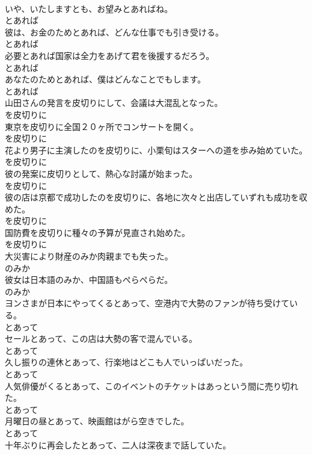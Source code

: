 \documentclass[8pt]{extreport}
\begin{document}
\begin{CJK}{UTF8}{min}
\\	いや、いたしますとも、お望みとあればね。	
\\	とあれば
\\	彼は、お金のためとあれば、どんな仕事でも引き受ける。	
\\	とあれば
\\	必要とあれば国家は全力をあげて君を後援するだろう。	
\\	とあれば
\\	あなたのためとあれば、僕はどんなことでもします。	
\\	とあれば
\\	山田さんの発言を皮切りにして、会議は大混乱となった。	
\\	を皮切りに
\\	東京を皮切りに全国２０ヶ所でコンサートを開く。	
\\	を皮切りに
\\	花より男子に主演したのを皮切りに、小栗旬はスターへの道を歩み始めていた。	
\\	を皮切りに
\\	彼の発案に皮切りとして、熱心な討議が始まった。	
\\	を皮切りに
\\	彼の店は京都で成功したのを皮切りに、各地に次々と出店していずれも成功を収めた。	
\\	を皮切りに
\\	国防費を皮切りに種々の予算が見直され始めた。	
\\	を皮切りに
\\	大災害により財産のみか肉親までも失った。	
\\	のみか
\\	彼女は日本語のみか、中国語もぺらぺらだ。	
\\	のみか
\\	ヨンさまが日本にやってくるとあって、空港内で大勢のファンが待ち受けている。	
\\	とあって
\\	セールとあって、この店は大勢の客で混んでいる。	
\\	とあって
\\	久し振りの連休とあって、行楽地はどこも人でいっぱいだった。	
\\	とあって
\\	人気俳優がくるとあって、このイベントのチケットはあっという間に売り切れた。	
\\	とあって
\\	月曜日の昼とあって、映画館はがら空きでした。	
\\	とあって
\\	十年ぶりに再会したとあって、二人は深夜まで話していた。	

\end{CJK}
\end{document}
